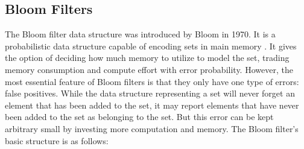 \documentclass[sigconf, nonacm]{acmart}
\begin{document}
%

\subsection{Bloom Filters}

The Bloom filter data structure was introduced by Bloom in 1970. It is a probabilistic data structure capable of encoding sets in main memory \cite{bloom_space/time_1970}. It gives the option of deciding how much memory to utilize to model the set, trading memory consumption and compute effort with error probability. However, the most essential feature of Bloom filters is that they only have one type of errors: false positives. While the data structure representing a set will never forget an element that has been added to the set, it may report elements that have never been added to the set as belonging to the set. But this error can be kept arbitrary small by investing more computation and memory. The Bloom filter's basic structure is as follows:
\end{document}
